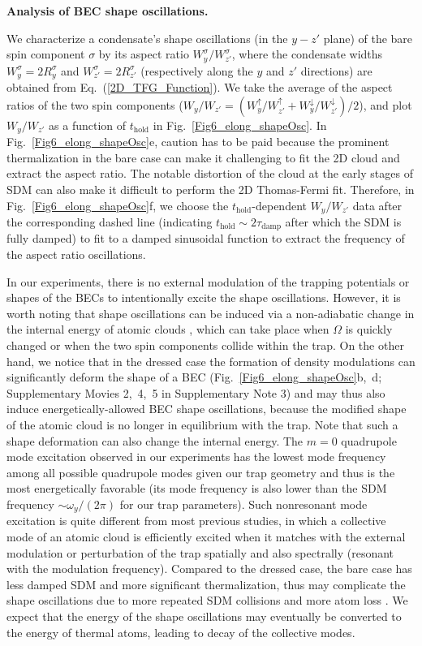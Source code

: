 \documentclass[showpacs,preprintnumbers,amsmath,amssymb, superscriptaddress, aps, reprint]{revtex4-1}
\def\thold{t_{\text{hold}}}
\begin{document}
{{{\textbf{Analysis of BEC shape oscillations.} 

We characterize a condensate's shape oscillations (in the $y-z'$ plane) of the bare spin component $\sigma$ by its aspect ratio $W_y^\sigma /W_{z'}^\sigma$, where the condensate widths $W_y^\sigma  = 2R_y^\sigma$ and $W_{z'}^\sigma  = 2R_{z'}^\sigma$ (respectively along the $y$ and $z'$ directions) are obtained from Eq.~(\ref{2D_TFG_Function}). We take the average of the aspect ratios of the two spin components (${W_y}/{W_{z'}} = (W_y^ \uparrow /W_{z'}^ \uparrow  + W_y^ \downarrow /W_{z'}^ \downarrow )/2$), and plot ${W_y}/{W_{z'}}$ as a function of $\thold$ in {Fig.~{\ref{Fig6_elong_shapeOsc}}}. In {Fig.~{\ref{Fig6_elong_shapeOsc}}e}, caution has to be paid because the prominent thermalization in the bare case can make it challenging to fit the 2D cloud and extract the aspect ratio. The notable distortion of the cloud at the early stages of SDM can also make it difficult to perform the 2D Thomas-Fermi fit. Therefore, in {Fig.~{\ref{Fig6_elong_shapeOsc}}f}, we choose the $\thold$-dependent ${W_y}/{W_{z'}}$ data after the corresponding dashed line (indicating ${\thold}\sim 2{\tau_{\text{damp}}}$ after which the SDM is fully damped) to fit to a damped sinusoidal function to extract the frequency of the aspect ratio oscillations.

In our experiments, there is no external modulation of the trapping potentials or shapes of the BECs to intentionally excite the shape oscillations. However, it is worth noting that shape oscillations can be induced via a non-adiabatic change in the internal energy of atomic clouds \cite{Inguscio_PRL2000,Matthews_interEng_PRL1998}, which can take place when $\Omega$ is quickly changed or when the two spin components collide within the trap. On the other hand, we notice that in the dressed case the formation of density modulations can significantly deform the shape of a BEC ({Fig.~{\ref{Fig6_elong_shapeOsc}}b,~d}; Supplementary Movies 2,~4,~5 in Supplementary Note 3) and may thus also induce energetically-allowed BEC shape oscillations, because the modified shape of the atomic cloud is no longer in equilibrium with the trap. Note that such a shape deformation can also change the internal energy. The $m = 0$ quadrupole mode excitation observed in our experiments has the lowest mode frequency among all possible quadrupole modes given our trap geometry and thus is the most energetically favorable (its mode frequency is also lower than the SDM frequency $\sim\omega_y/(2\pi)$ for our trap parameters). Such nonresonant mode excitation is quite different from most previous studies, in which a collective mode of an atomic cloud is efficiently excited when it matches with the external modulation or perturbation of the trap \cite{Ketterle_Collective_PRL1996,Jin_Quadru_PRL1996} spatially and also spectrally (resonant with the modulation frequency). Compared to the dressed case, the bare case has less damped SDM and more significant thermalization, thus may complicate the shape oscillations due to more repeated SDM collisions and more atom loss \cite{Inguscio_PRL2000,Matthews_interEng_PRL1998}. We expect that the energy of the shape oscillations may eventually be converted to the energy of thermal atoms, leading to decay of the collective modes.

}}}
\end{document}
